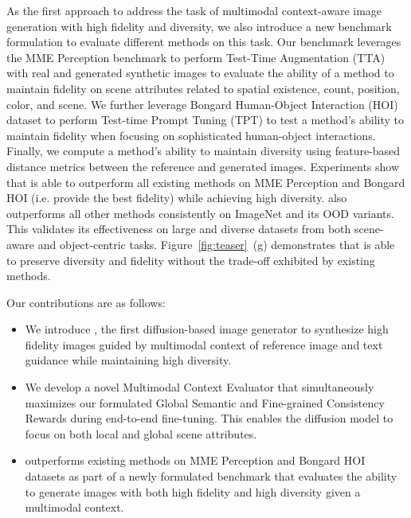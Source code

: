 As the first approach to address the task of multimodal context-aware image generation with high fidelity and diversity, we also introduce a new benchmark formulation to evaluate different methods on this task. Our benchmark leverages the MME Perception benchmark \citep{fu2024mme} to perform Test-Time Augmentation (TTA) \citep{shanmugam2021better,kim2020learning} with real and generated synthetic images to evaluate the ability of a method to maintain fidelity on scene attributes related to spatial existence, count, position, color, and scene. We further leverage Bongard Human-Object Interaction (HOI) \citep{jiang2022bongard} dataset to perform Test-time Prompt Tuning (TPT) \citep{shu2022testtime} to test a method’s ability to maintain fidelity when focusing on sophisticated human-object interactions. Finally, we compute a method’s ability to maintain diversity using feature-based distance metrics between the reference and generated images. Experiments show that \method is able to outperform all existing methods on MME Perception and Bongard HOI (i.e. provide the best fidelity) while achieving high diversity. \method also outperforms all other methods consistently on ImageNet and its OOD variants. This validates its effectiveness on large and diverse datasets from both scene-aware and object-centric tasks. Figure~\ref{fig:teaser}~(g) demonstrates that \method is able to preserve diversity and fidelity without the trade-off exhibited by existing methods.
 
Our contributions are as follows:
\begin{itemize}
    \item We introduce \method, the first diffusion-based image generator to synthesize high fidelity images guided by multimodal context of reference image and text guidance while maintaining high diversity.
    \item We develop a novel Multimodal Context Evaluator that simultaneously maximizes our formulated Global Semantic and Fine-grained Consistency Rewards during end-to-end fine-tuning. This enables the diffusion model to focus on both local and global scene attributes. 
   \item \method outperforms existing methods on MME Perception and Bongard HOI datasets as part of a newly formulated benchmark that evaluates the ability to generate images with both high fidelity and high diversity given a multimodal context.
\end{itemize}

